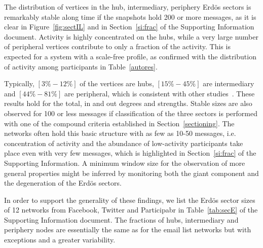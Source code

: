 \documentclass[%
	aip,
	jmp,%
	amsmath,amssymb,
	reprint,%
]{revtex4-1}
\begin{document}
																																																																																The distribution of vertices in the hub, intermediary, periphery Erd\"os sectors is remarkably stable along time if the snapshots hold 200 or more messages, as it is clear in Figure~\ref{fig:sectIL} and in Section~\ref{si:frac} of the Supporting Information document. 
																																																																																Activity is highly concentrated on the hubs, while a very large number of peripheral vertices contribute to only a fraction of the activity.
																																																																																This is expected for a system with a scale-free profile, as confirmed with the distribution of activity among participants in Table~\ref{autores}.

																																																																																Typically, $[3\%-12\%]$ of the vertices are hubs,
																																																																																	$[15\%-45\%]$ are intermediary and $[44\%-81\%]$ are peripheral,
																																																																																		which is consistent with other studies~\cite{secFree}.
																																																																																		These results hold for the total, in and out degrees and strengths.
																																																																																		Stable sizes are also observed for 100 or less messages if classification 
																																																																																		of the three sectors is performed with one of the compound criteria established in Section~\ref{sectioning}. The networks often hold this basic structure with as few as 10-50 messages, i.e. concentration of activity and the abundance of low-activity participants take place even with very few messages, which is highlighted in Section~\ref{si:frac} of the Supporting Information. A minimum window size for the observation of more general properties might be inferred by monitoring 
																																																																																		both the giant component and the degeneration of the Erd\"os sectors.

																																																																																		In order to support the generality of these findings,
																																																																																		we list the Erd\"os sector sizes of 12 networks from Facebook, Twitter and Participabr in Table~\ref{tab:secE} of the Supporting Information document. The fractions of hubs, intermediary and periphery nodes are
																																																																																		essentially the same as for the email list networks but with exceptions and a greater variability.
\end{document}
